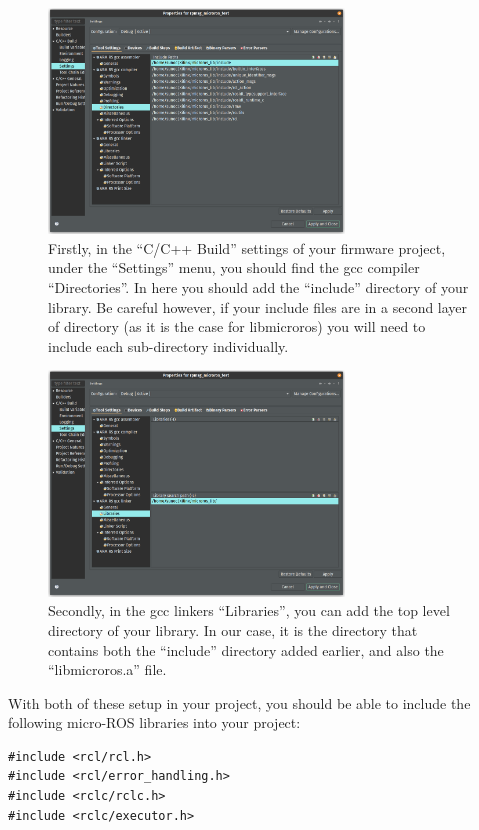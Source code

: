 \documentclass[10pt]{article}
\begin{document}
\label{sec:including-micro-ros}
\begin{figure}[H]
  \centering
  \includegraphics[width=0.7\textwidth]{./img/vitis_new/include}
  \caption{Firstly, in the ``C/C++ Build'' settings of your firmware project, under the ``Settings'' menu, you should find the gcc compiler
    ``Directories''. In here you should add the ``include'' directory of your library. Be careful however, if your include files are in
  a second layer of directory (as it is the case for libmicroros) you will need to include each sub-directory individually.}
  \label{fig:include1}
\end{figure}

\begin{figure}[H]
  \centering
  \includegraphics[width=0.7\textwidth]{./img/vitis_new/include2}
  \caption{Secondly, in the gcc linkers ``Libraries'', you can add the top level directory of your library. In our case, it is the
    directory that contains both the ``include'' directory added earlier, and also the ``libmicroros.a'' file.}
  \label{fig:include2}
\end{figure}

With both of these setup in your project, you should be able to include the following micro-ROS libraries into your project:
\begin{tcolorbox}
\begin{verbatim}
#include <rcl/rcl.h>
#include <rcl/error_handling.h>
#include <rclc/rclc.h>
#include <rclc/executor.h>
\end{verbatim}
\end{tcolorbox}
\end{document}
